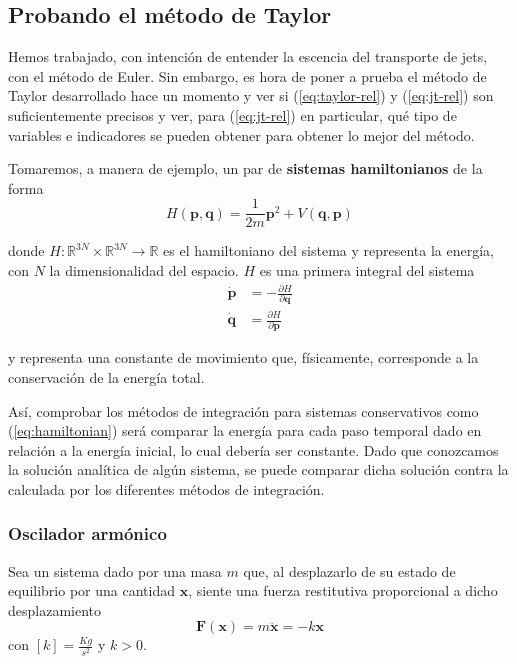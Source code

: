 \subsection{Probando el método de Taylor}
\label{sec:benchmark-taylor}

Hemos trabajado, con intención de entender la escencia del transporte de jets, con el método de Euler. Sin embargo, es hora de poner a prueba el método de Taylor desarrollado hace un momento y ver si (\ref{eq:taylor-rel}) y (\ref{eq:jt-rel}) son suficientemente precisos y ver, para (\ref{eq:jt-rel}) en particular, qué tipo de variables e indicadores se pueden obtener para obtener lo mejor del método.

Tomaremos, a manera de ejemplo, un par de \textbf{sistemas hamiltonianos} de la forma
\begin{equation}
 H(\mathbf{p},\mathbf{q}) = \frac{1}{2m}\mathbf{p}^2 + V(\mathbf{q},\mathbf{p})
 \label{eq:hamiltonian}
\end{equation}

donde $H: \mathbb{R}^{3N}\times\mathbb{R}^{3N} \to \mathbb{R}$ es el hamiltoniano del sistema y representa la energía, con $N$ la dimensionalidad del espacio. $H$ es una primera integral del sistema
\begin{align}
 \dot{\mathbf{p}} &= -\frac{\partial{H}}{\partial{\mathbf{q}}} \nonumber \\
 \dot{\mathbf{q}} &= \frac{\partial{H}}{\partial{\mathbf{p}}}
\label{eq:ham-rel}
\end{align}

y representa una constante de movimiento que, físicamente, corresponde a la conservación de la energía total.

Así, comprobar los métodos de integración para sistemas conservativos como (\ref{eq:hamiltonian}) será comparar la energía para cada paso temporal dado en relación a la energía inicial, lo cual debería ser constante. 
Dado que conozcamos la solución analítica de algún sistema, se puede comparar dicha solución contra la calculada por los diferentes métodos de integración.

\subsubsection{Oscilador armónico}
\label{sec:oscilador}
Sea un sistema dado por una masa $m$ que, al desplazarlo de su estado de equilibrio por una cantidad $\mathbf{x}$, siente una fuerza restitutiva proporcional a dicho desplazamiento
\begin{equation}
 \mathbf{F}(\mathbf{x}) = m \ddot{\mathbf{x}} = - k\mathbf{x}
 \label{eq:oscilador_force}
\end{equation}
con $[k] = \frac{Kg}{s^2}$  y $k>0$. 

